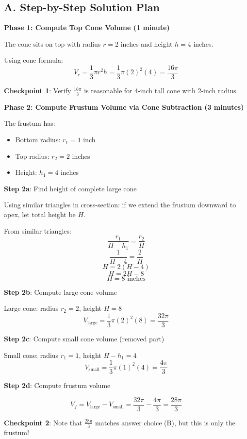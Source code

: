 \documentclass[]{article}
\begin{document}
\begin{solutionbox}
\subsection*{A. Step-by-Step Solution Plan}

\textbf{Phase 1: Compute Top Cone Volume (1 minute)}

The cone sits on top with radius $r = 2$ inches and height $h = 4$ inches.

Using cone formula:
$$V_c = \frac{1}{3}\pi r^2 h = \frac{1}{3}\pi (2)^2 (4) = \frac{16\pi}{3}$$

\textbf{Checkpoint 1}: Verify $\frac{16\pi}{3}$ is reasonable for 4-inch tall cone with 2-inch radius.

\textbf{Phase 2: Compute Frustum Volume via Cone Subtraction (3 minutes)}

The frustum has:
\begin{itemize}
    \item Bottom radius: $r_1 = 1$ inch
    \item Top radius: $r_2 = 2$ inches
    \item Height: $h_1 = 4$ inches
\end{itemize}

\textbf{Step 2a}: Find height of complete large cone

Using similar triangles in cross-section: if we extend the frustum downward to apex, let total height be $H$.

From similar triangles:
$$\frac{r_1}{H-h_1} = \frac{r_2}{H}$$
$$\frac{1}{H-4} = \frac{2}{H}$$
$$H = 2(H-4)$$
$$H = 2H - 8$$
$$H = 8 \text{ inches}$$

\textbf{Step 2b}: Compute large cone volume

Large cone: radius $r_2 = 2$, height $H = 8$
$$V_{\text{large}} = \frac{1}{3}\pi (2)^2 (8) = \frac{32\pi}{3}$$

\textbf{Step 2c}: Compute small cone volume (removed part)

Small cone: radius $r_1 = 1$, height $H - h_1 = 4$
$$V_{\text{small}} = \frac{1}{3}\pi (1)^2 (4) = \frac{4\pi}{3}$$

\textbf{Step 2d}: Compute frustum volume

$$V_f = V_{\text{large}} - V_{\text{small}} = \frac{32\pi}{3} - \frac{4\pi}{3} = \frac{28\pi}{3}$$

\textbf{Checkpoint 2}: Note that $\frac{28\pi}{3}$ matches answer choice (B), but this is only the frustum!


\end{solutionbox}
\end{document}
